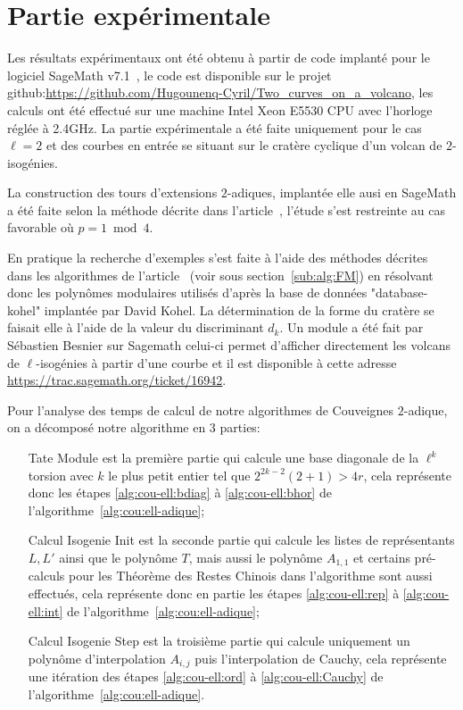 \documentclass[10pt,a4paper]{book}
\theoremstyle{plain}
\theoremstyle{definition}
\theoremstyle{definition}
\theoremstyle{definition}
\theoremstyle{definition}
\theoremstyle{remark}
\theoremstyle{remark}
\theoremstyle{definition}
\begin{document}
\section{Partie expérimentale}

Les résultats expérimentaux ont été obtenu à partir de code implanté pour le 
logiciel SageMath v7.1~\cite{Sage}, le code est disponible sur le projet 
github:\url{https://github.com/Hugounenq-Cyril/Two_curves_on_a_volcano}, les 
calculs ont été effectué sur une machine Intel Xeon E5530 CPU avec l'horloge 
réglée à 2.4GHz. La partie expérimentale a été faite uniquement pour le cas 
$\ell=2$ et des courbes en entrée se situant sur le cratère cyclique d'un 
volcan de $2$-isogénies.

La construction des tours d'extensions $2$-adiques, implantée elle ausi en 
SageMath a été faite selon la méthode
décrite dans l'article~\cite{Doliskani-Schost15}, l'étude s'est restreinte au 
cas favorable où $p=1 \bmod 4$.

En pratique la recherche d'exemples s'est faite à l'aide des méthodes décrites
dans les algorithmes de l'article~\cite{FouquetMorain02} (voir sous section~\ref{sub:alg:FM}) en résolvant donc les
polynômes modulaires utilisés d'après la base de données "database-kohel" 
implantée par David Kohel. La détermination de la forme du cratère se faisait 
elle à l'aide de la valeur du discriminant $d_k$. Un module a été fait par 
Sébastien Besnier sur Sagemath celui-ci permet d'afficher directement les 
volcans de $\ell$-isogénies à partir d'une courbe et il est disponible à cette 
adresse \url{https://trac.sagemath.org/ticket/16942}. 

Pour l'analyse des temps de calcul de notre algorithmes de Couveignes 
$2$-adique, on a décomposé notre algorithme en 3 parties:
\begin{enumerate}
\item[Tate Module] est la première partie qui calcule une base diagonale de la 
$\ell^k$ torsion avec $k$ le plus petit entier tel que $2^{2k-2}(2+1)> 4r$,
cela représente donc les étapes \ref{alg:cou-ell:bdiag} à \ref{alg:cou-ell:bhor} de l'algorithme~\ref{alg:cou:ell-adique};
\item[Calcul Isogenie Init] est la seconde partie qui calcule les listes de 
représentants $L,L'$ ainsi que le polynôme $T$, mais aussi le polynôme 
$A_{1,1}$ et certains pré-calculs pour les Théorème des Restes Chinois dans 
l'algorithme sont aussi effectués, cela représente donc en partie les étapes 
\ref{alg:cou-ell:rep} à \ref{alg:cou-ell:int} de 
l'algorithme~\ref{alg:cou:ell-adique};
\item[Calcul Isogenie Step] est la troisième partie qui calcule uniquement 
un polynôme d'interpolation $A_{i,j}$ puis l'interpolation de 
Cauchy, cela représente une itération des étapes \ref{alg:cou-ell:ord} à 
\ref{alg:cou-ell:Cauchy} de l'algorithme~\ref{alg:cou:ell-adique}.
\end{enumerate}
\end{document}
